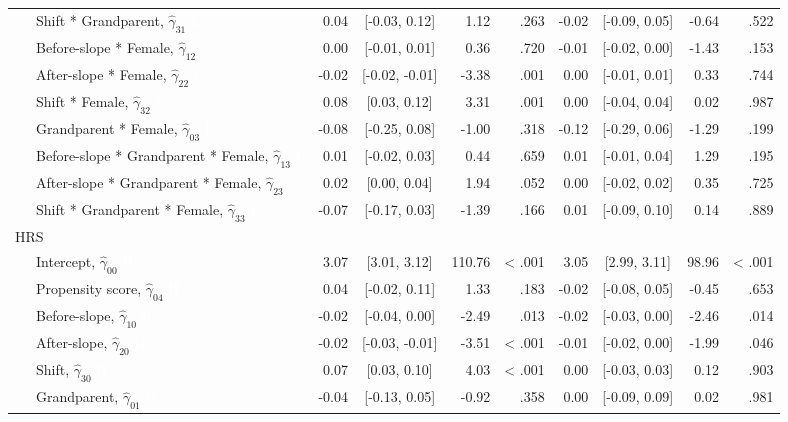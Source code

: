 \documentclass[
  english,
  man, noextraspace,floatsintext]{apa7}
\newenvironment{lltable}{\begin{landscape}\begin{center}\begin{ThreePartTable}}{\end{ThreePartTable}\end{center}\end{landscape}}
\begin{document}
\begin{appendix}
\begin{lltable}
{\begin{longtable}{lrcrrrcrr}
\ \ \ Shift * Grandparent, $\hat{\gamma}_{31}$ \textcolor{white}{L} & 0.04 & {}[-0.03, 0.12] & 1.12 & .263 & -0.02 & {}[-0.09, 0.05] & -0.64 & .522\\
\ \ \ Before-slope * Female, $\hat{\gamma}_{12}$ \textcolor{white}{L} & 0.00 & {}[-0.01, 0.01] & 0.36 & .720 & -0.01 & {}[-0.02, 0.00] & -1.43 & .153\\
\ \ \ After-slope * Female, $\hat{\gamma}_{22}$ \textcolor{white}{L} & -0.02 & {}[-0.02, -0.01] & -3.38 & .001 & 0.00 & {}[-0.01, 0.01] & 0.33 & .744\\
\ \ \ Shift * Female, $\hat{\gamma}_{32}$ \textcolor{white}{L} & 0.08 & {}[0.03, 0.12] & 3.31 & .001 & 0.00 & {}[-0.04, 0.04] & 0.02 & .987\\
\ \ \ Grandparent * Female, $\hat{\gamma}_{03}$ \textcolor{white}{L} & -0.08 & {}[-0.25, 0.08] & -1.00 & .318 & -0.12 & {}[-0.29, 0.06] & -1.29 & .199\\
\ \ \ Before-slope * Grandparent * Female, $\hat{\gamma}_{13}$ \textcolor{white}{L} & 0.01 & {}[-0.02, 0.03] & 0.44 & .659 & 0.01 & {}[-0.01, 0.04] & 1.29 & .195\\
\ \ \ After-slope * Grandparent * Female, $\hat{\gamma}_{23}$ \textcolor{white}{L} & 0.02 & {}[0.00, 0.04] & 1.94 & .052 & 0.00 & {}[-0.02, 0.02] & 0.35 & .725\\
\ \ \ Shift * Grandparent * Female, $\hat{\gamma}_{33}$ \textcolor{white}{L} & -0.07 & {}[-0.17, 0.03] & -1.39 & .166 & 0.01 & {}[-0.09, 0.10] & 0.14 & .889\\
HRS &  &  &  &  &  &  &  & \\
\ \ \ Intercept, $\hat{\gamma}_{00}$ \textcolor{white}{H} & 3.07 & {}[3.01, 3.12] & 110.76 & < .001 & 3.05 & {}[2.99, 3.11] & 98.96 & < .001\\
\ \ \ Propensity score, $\hat{\gamma}_{04}$ \textcolor{white}{H} & 0.04 & {}[-0.02, 0.11] & 1.33 & .183 & -0.02 & {}[-0.08, 0.05] & -0.45 & .653\\
\ \ \ Before-slope, $\hat{\gamma}_{10}$ \textcolor{white}{H} & -0.02 & {}[-0.04, 0.00] & -2.49 & .013 & -0.02 & {}[-0.03, 0.00] & -2.46 & .014\\
\ \ \ After-slope, $\hat{\gamma}_{20}$ \textcolor{white}{H} & -0.02 & {}[-0.03, -0.01] & -3.51 & < .001 & -0.01 & {}[-0.02, 0.00] & -1.99 & .046\\
\ \ \ Shift, $\hat{\gamma}_{30}$ \textcolor{white}{H} & 0.07 & {}[0.03, 0.10] & 4.03 & < .001 & 0.00 & {}[-0.03, 0.03] & 0.12 & .903\\
\ \ \ Grandparent, $\hat{\gamma}_{01}$ \textcolor{white}{H} & -0.04 & {}[-0.13, 0.05] & -0.92 & .358 & 0.00 & {}[-0.09, 0.09] & 0.02 & .981\\

\end{longtable}}
\end{lltable}
\end{appendix}
\end{document}

